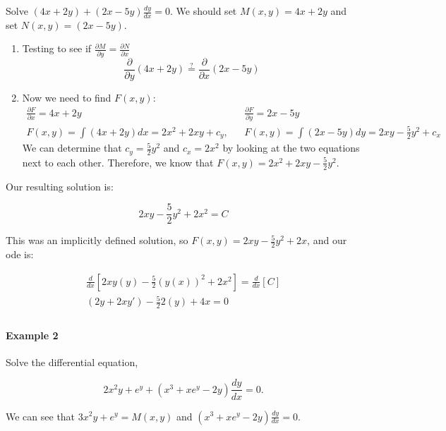     \begin{problem}
      Solve $(4x+2y)+(2x-5y)\frac{dy}{dx}=0$. We should set $M(x,y)=4x+2y$ and set $N(x,y)=(2x-5y)$.

    \begin{enumerate}
      \item Testing to see if $\frac{\partial M}{\partial y}=\frac{\partial N}{\partial x}$
        \begin{equation}
          \frac{\partial}{\partial y}(4x+2y)\stackrel{?}{=}\frac{\partial}{\partial x}(2x-5y)
        \end{equation}
      \item Now we need to find $F(x,y)$:
        \begin{align}
          \frac{\partial F}{\partial x}=4x+2y && \frac{\partial F}{\partial y}=2x-5y\\
          F(x,y)=\int(4x+2y)dx=2x^2+2xy+c_y, && F(x,y)=\int(2x-5y)dy=2xy-\frac{5}{2}y^2+c_x
        \end{align}
        We can determine that $c_y=\frac{5}{2}y^2$ and $c_x=2x^2$ by looking at the two equations next to each other. Therefore, we know that $F(x,y)=2x^2+2xy-\frac{5}{2}y^2$.
    \end{enumerate}
    Our resulting solution is:

    \begin{equation}
      \boxed{2xy-\frac{5}{2}y^2+2x^2=C}
    \end{equation}

    This was an implicitly defined solution, so $F(x,y)=2xy-\frac{5}{2}y^2+2x$, and our ode is:
    
    \begin{align}
      \frac{d}{dx}\left[2xy(y)-\frac{5}{2}(y(x))^2+2x^2\right]=\frac{d}{dx}[C]\\
      (2y+2xy')-\frac{5}{2}2(y)+4x=0\\
    \end{align}

    \paragraph{Example 2} Solve the differential equation,
    
    \begin{equation}
      2x^2y+e^y+(x^3+xe^y-2y)\frac{dy}{dx}=0. 
    \end{equation}

    We can see that $3x^2y+e^y = M(x,y)$ and $(x^3+xe^y-2y)\frac{dy}{dx}=0$.


\end{problem}
